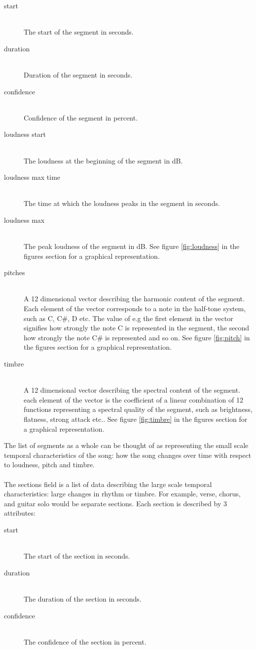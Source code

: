 \begin{description}
	\item[start] \hfill \\The start of the segment in seconds.
	\item[duration] \hfill \\Duration of the segment in seconds.
	\item[confidence] \hfill \\Confidence of the segment in percent.
	\item[loudness start] \hfill \\The loudness at the beginning of the segment in dB.
	\item[loudness max time] \hfill \\The time at which the loudness peaks in the segment in seconds.
	\item[loudness max] \hfill \\The peak loudness of the segment in dB. See figure \ref{fig:loudness} in the figures section for a graphical representation.
	\item[pitches] \hfill \\A 12 dimensional vector describing the harmonic content of the segment. Each element of the vector corresponds to a note in the half-tone system, such as C, C\#, D etc. The value of e.g the first element in the vector signifies how strongly the note C is represented in the segment, the second how strongly the note C\# is represented and so on. See figure \ref{fig:pitch} in the figures section for a graphical representation.
	\item[timbre] \hfill \\A 12 dimensional vector describing the spectral content of the segment. each element of the vector is the coefficient of a linear combination of 12 functions representing a spectral quality of the segment, such as brightness, flatness, strong attack etc.. See figure \ref{fig:timbre} in the figures section for a graphical representation.
\end{description}
\noindent The list of segments as a whole can be thought of as representing the small scale temporal characteristics of the song: how the song changes over time with respect to loudness, pitch and timbre.
\\\\
The sections field is a list of data describing the large scale temporal characteristics: large changes in rhythm or timbre. For example, verse, chorus, and guitar solo would be separate sections. Each section is described by 3 attributes:
\begin{description}
	\item[start] \hfill \\The start of the section in seconds.
	\item[duration] \hfill \\The duration of the section in seconds.
	\item[confidence] \hfill \\The confidence of the section in percent.
\end{description}

